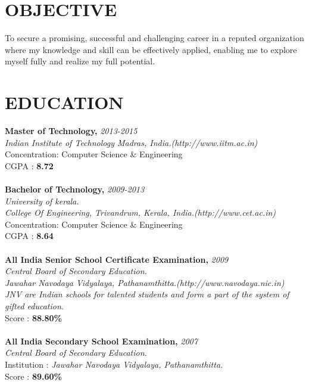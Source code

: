 \documentclass[line, margin]{res}
\begin{document}
\address{\large \url{mail@abilng.in}}
\address{\large (+91)9497359361}
\thispagestyle{empty} %

\begin{resume}

  \section{OBJECTIVE}
  To secure a promising, successful and challenging career in a reputed organization where my knowledge and skill can be effectively applied, enabling me to explore myself fully and realize my full potential.\\

  \section{EDUCATION}
  \textbf{ Master of Technology, }\hfill \textit{2013-2015}\\
  \textit{Indian Institute of Technology Madras, India.\hfill(http://www.iitm.ac.in)} \\
  Concentration: Computer Science \& Engineering \\
  CGPA : \textbf{ 8.72} \\\\
  \textbf{ Bachelor of Technology, }\hfill \textit{2009-2013}\\
  \textit{University of kerala.}\\
  \textit{College Of Engineering, Trivandrum, Kerala, India.\hfill(http://www.cet.ac.in)} \\
  Concentration: Computer Science \& Engineering \\
  CGPA : \textbf{ 8.64} \\\\
  \textbf{ All India Senior School Certificate Examination, }\hfill \textit{2009}\\
  \textit{Central Board of Secondary Education.}\\
  \textit{Jawahar Navodaya Vidyalaya, Pathanamthitta.}\hfill{\it(http://www.navodaya.nic.in)}\\
  \textit{JNV are Indian schools for talented students and form a part of the system of gifted education.}\\
  Score       : \textbf{ 88.80\% } \\\\
  \textbf{ All India Secondary School Examination, }\hfill \textit{2007}\\
  \textit{Central Board of Secondary Education.}\\
  Institution : \textit{Jawahar Navodaya Vidyalaya, Pathanamthitta.} \\
  Score       : \textbf{ 89.60\% } \\


\end{resume}
\end{document}
